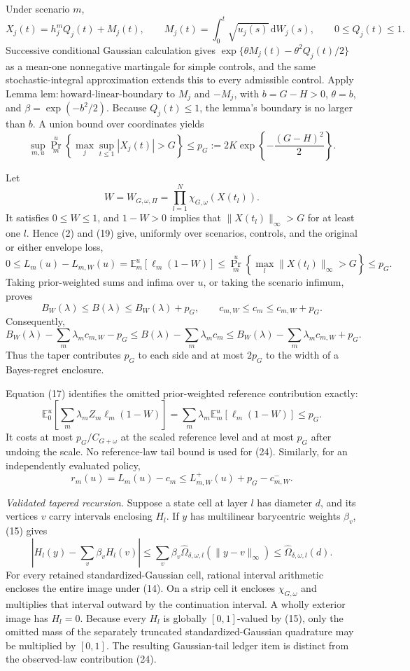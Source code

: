 Under scenario \(m\),
\[
 X_j(t)=h_j^mQ_j(t)+M_j(t),
 \qquad
 M_j(t)=\int_0^t\sqrt{u_j(s)}\,\mathrm dW_j(s),
 \qquad 0\leq Q_j(t)\leq1.
 \tag{18}
\]
Successive conditional Gaussian calculation gives
\(\exp\{\theta M_j(t)-\theta^2Q_j(t)/2\}\) as a mean-one nonnegative martingale for simple controls, and the same stochastic-integral approximation extends this to every admissible control.  Apply Lemma \(\mathrm{lem{:}howard\text{-}linear\text{-}boundary}\) to \(M_j\) and \(-M_j\), with \(b=G-H>0\), \(\theta=b\), and \(\beta=\exp(-b^2/2)\).  Because \(Q_j(t)\leq1\), the lemma's boundary is no larger than \(b\).  A union bound over coordinates yields
\[
 \sup_{m,u}\Pr_m^u\!\left\{\max_j\sup_{t\leq1}|X_j(t)|>G\right\}
 \leq p_G:=2K\exp\!\left\{-\frac{(G-H)^2}{2}\right\}.
 \tag{19}
\]

Let
\[
 W=W_{G,\omega,\Pi}=\prod_{l=1}^N\chi_{G,\omega}(X(t_l)).
 \tag{20}
\]
It satisfies \(0\leq W\leq1\), and \(1-W>0\) implies that \(\|X(t_l)\|_\infty>G\) for at least one \(l\).  Hence (2) and (19) give, uniformly over scenarios, controls, and the original or either envelope loss,
\[
 0\leq L_m(u)-L_{m,W}(u)
 =\mathbb E_m^u[\ell_m(1-W)]
 \leq\Pr_m^u\!\left\{\max_l\|X(t_l)\|_\infty>G\right\}
 \leq p_G.
 \tag{21}
\]
Taking prior-weighted sums and infima over \(u\), or taking the scenario infimum, proves
\[
 B_W(\lambda)\leq B(\lambda)\leq B_W(\lambda)+p_G,
 \qquad
 c_{m,W}\leq c_m\leq c_{m,W}+p_G.
 \tag{22}
\]
Consequently,
\[
 B_W(\lambda)-\sum_m\lambda_mc_{m,W}-p_G
 \leq B(\lambda)-\sum_m\lambda_mc_m
 \leq B_W(\lambda)-\sum_m\lambda_mc_{m,W}+p_G.
 \tag{23}
\]
Thus the taper contributes \(p_G\) to each side and at most \(2p_G\) to the width of a Bayes-regret enclosure.

Equation (17) identifies the omitted prior-weighted reference contribution exactly:
\[
 \mathbb E_0^u\!\left[
 \sum_m\lambda_mZ_m\ell_m(1-W)\right]
 =\sum_m\lambda_m\mathbb E_m^u[\ell_m(1-W)]\leq p_G.
 \tag{24}
\]
It costs at most \(p_G/C_{G+\omega}\) at the scaled reference level and at most \(p_G\) after undoing the scale.  No reference-law tail bound is used for (24).  Similarly, for an independently evaluated policy,
\[
 r_m(u)=L_m(u)-c_m
 \leq L_{m,W}^+(u)+p_G-c_{m,W}^-.
 \tag{25}
\]

\emph{Validated tapered recursion.}
Suppose a state cell at layer \(l\) has diameter \(d\), and its vertices \(v\) carry intervals enclosing \(H_l\).  If \(y\) has multilinear barycentric weights \(\beta_v\), (15) gives
\[
 \left|H_l(y)-\sum_v\beta_vH_l(v)\right|
 \leq\sum_v\beta_v\widehat\Omega_{\delta,\omega,l}(\|y-v\|_\infty)
 \leq\widehat\Omega_{\delta,\omega,l}(d).
 \tag{26}
\]
For every retained standardized-Gaussian cell, rational interval arithmetic encloses the entire image under (14).  On a strip cell it encloses \(\chi_{G,\omega}\) and multiplies that interval outward by the continuation interval.  A wholly exterior image has \(H_l=0\).  Because every \(H_l\) is globally \([0,1]\)-valued by (15), only the omitted mass of the separately truncated standardized-Gaussian quadrature may be multiplied by \([0,1]\).  The resulting Gaussian-tail ledger item is distinct from the observed-law contribution (24).

